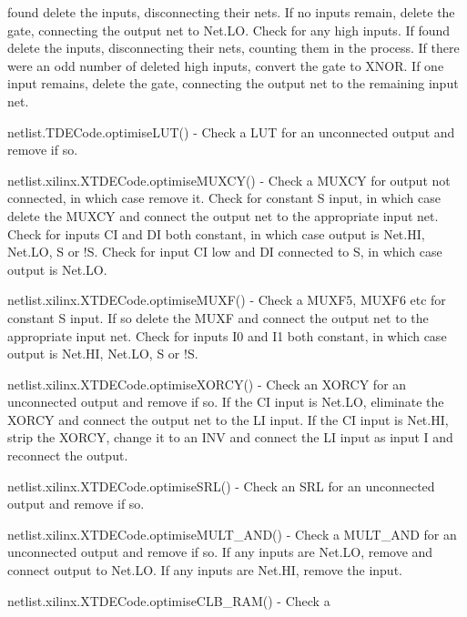 \documentclass[10pt,a4paper,twoside,fleqn]{book}
\begin{document}
                found delete the inputs, disconnecting their nets. If no
                inputs remain, delete the gate, connecting the output net
                to Net.LO. Check for any high inputs. If found delete the
                inputs, disconnecting their nets, counting them in the
                process. If there were an odd number of deleted high
                inputs, convert the gate to XNOR. If one input remains,
                delete the gate, connecting the output net to the
                remaining input net.
        \item   netlist.TDECode.optimiseLUT() - Check a LUT for an
                unconnected output and remove if so.
        \item   netlist.xilinx.XTDECode.optimiseMUXCY() - Check a MUXCY
                for output not connected, in which case remove it. Check
                for constant S input, in which case delete the MUXCY and
                connect the output net to the appropriate input net.
                Check for inputs CI and DI both constant, in which case
                output is Net.HI, Net.LO, S or !S. Check for input CI low
                and DI connected to S, in which case output is Net.LO.
        \item   netlist.xilinx.XTDECode.optimiseMUXF() - Check a MUXF5,
                MUXF6 etc for constant S input. If so delete the MUXF and
                connect the output net to the appropriate input net. Check
                for inputs I0 and I1 both constant, in which case output is
                Net.HI, Net.LO, S or !S.
        \item   netlist.xilinx.XTDECode.optimiseXORCY() - Check an XORCY
                for an unconnected output and remove if so. If the CI input
                is Net.LO, eliminate the XORCY and connect the output net to
                the LI input. If the CI input is Net.HI, strip the XORCY,
                change it to an INV and connect the LI input as input I and
                reconnect the output.
        \item   netlist.xilinx.XTDECode.optimiseSRL() - Check an SRL for an
                unconnected output and remove if so.
        \item   netlist.xilinx.XTDECode.optimiseMULT\_AND() - Check a
                MULT\_AND for an unconnected output and remove if so. If any
                inputs are Net.LO, remove and connect output to Net.LO. If any
                inputs are Net.HI, remove the input.
        \item   netlist.xilinx.XTDECode.optimiseCLB\_RAM() - Check a
\end{document}
